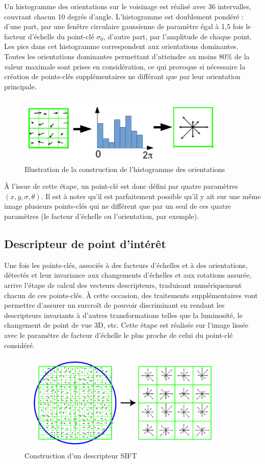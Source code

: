 Un histogramme des orientations sur le voisinage est réalisé avec 36 intervalles, couvrant chacun 10 degrés d'angle. L'histogramme est doublement pondéré : d'une part, par une fenêtre circulaire gaussienne de paramètre égal à 1,5 fois le facteur d'échelle du point-clé $\sigma_0$, d'autre part, par l'amplitude de chaque point. Les pics dans cet histogramme correspondent aux orientations dominantes. Toutes les orientations dominantes permettant d'atteindre au moins 80\% de la valeur maximale sont prises en considération, ce qui provoque si nécessaire la création de points-clés supplémentaires ne différant que par leur orientation principale\cite{low04}.

\begin{figure}[ht!]
\centering
\includegraphics[width=100mm]{images/sift_hist}
\caption{Illustration de la construction de l'histogramme des orientations}
\label{overflow}
\end{figure}

À l'issue de cette étape, un point-clé est donc défini par quatre paramètres $( x, y, \sigma, \theta )$. Il est à noter qu'il est parfaitement possible qu'il y ait sur une même image plusieurs points-clés qui ne différent que par un seul de ces quatre paramètres (le facteur d'échelle ou l'orientation, par exemple).


\subsection{Descripteur de point d'intérêt}
Une fois les points-clés, associés à des facteurs d'échelles et à des orientations, détectés et leur invariance aux changements d'échelles et aux rotations assurée, arrive l'étape de calcul des vecteurs descripteurs, traduisant numériquement chacun de ces points-clés. À cette occasion, des traitements supplémentaires vont permettre d'assurer un surcroît de pouvoir discriminant en rendant les descripteurs invariants à d'autres transformations telles que la luminosité, le changement de point de vue 3D, etc. Cette étape est réalisée sur l'image lissée avec le paramètre de facteur d'échelle le plus proche de celui du point-clé considéré\cite{low04}.
\begin{figure}[ht!]
\centering
\includegraphics[width=100mm]{images/siftdescriptor}
\caption{Construction d'un descripteur SIFT\cite{khang09}}
\label{overflow}
\end{figure}

